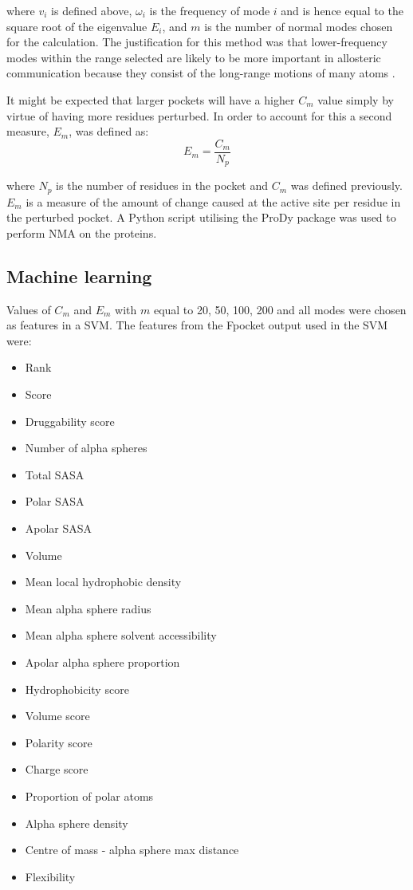 where $v_{i}$ is defined above, $\omega_{i}$ is the frequency of mode $i$ and is hence equal to the square root of the eigenvalue $E_{i}$, and $m$ is the number of normal modes chosen for the calculation.
The justification for this method was that lower-frequency modes within the range selected are likely to be more important in allosteric communication because they consist of the long-range motions of many atoms \cite{Rodgers2013}.

It might be expected that larger pockets will have a higher $C_{m}$ value simply by virtue of having more residues perturbed.
In order to account for this a second measure, $E_{m}$, was defined as:
$$
E_{m} = \frac{C_{m}}{N_{p}}
$$

where $N_{p}$ is the number of residues in the pocket and $C_{m}$ was defined previously.
$E_{m}$ is a measure of the amount of change caused at the active site per residue in the perturbed pocket.
A Python script utilising the ProDy package \cite{Bakan2011} was used to perform NMA on the proteins.


\subsection{Machine learning}

Values of $C_{m}$ and $E_{m}$ with $m$ equal to 20, 50, 100, 200 and all modes were chosen as features in a SVM.
The features from the Fpocket output used in the SVM were:
\begin{itemize}
\item Rank
\item Score
\item Druggability score
\item Number of alpha spheres
\item Total SASA
\item Polar SASA
\item Apolar SASA
\item Volume
\item Mean local hydrophobic density
\item Mean alpha sphere radius
\item Mean alpha sphere solvent accessibility
\item Apolar alpha sphere proportion
\item Hydrophobicity score
\item Volume score
\item Polarity score
\item Charge score
\item Proportion of polar atoms
\item Alpha sphere density
\item Centre of mass - alpha sphere max distance
\item Flexibility
\end{itemize}

